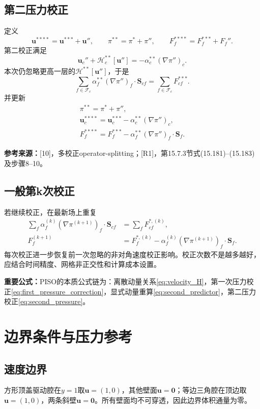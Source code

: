\documentclass[UTF8,12pt,a4paper]{ctexart}
\numberwithin{equation}{section}
\newcommand{\Issa}{\textnormal{[10]}}
\newcommand{\Rone}{\textnormal{[R1]}}
\newcommand{\source}[1]{\par\smallskip\noindent\colorbox{sourcebg}{%
  \parbox{0.955\linewidth}{\footnotesize\color{sourcegray}\textbf{参考来源：}#1}}\par\smallskip}
\newcommand{\keytitle}[1]{\par\smallskip\noindent\colorbox{keybg}{%
  \parbox{0.965\linewidth}{\color{keyblue}\textbf{重要公式：}#1}}\par\smallskip}
\begin{document}
\subsection{第二压力校正}
定义
\begin{equation}
  \bm u^{****}=\bm u^{***}+\bm u'',\qquad
  \pi^{**}=\pi^*+\pi'',\qquad
  F_f^{****}=F_f^{***}+F_f''.
\end{equation}
第二校正满足
\begin{equation}
  \bm u_c''+\mathcal H_c^{**}[\bm u'']
  =-\alpha_c^{**}(\nabla\pi'')_c.
  \label{eq:second_exact}
\end{equation}
本次仍忽略更高一层的$\mathcal H^{**}[\bm u'']$，于是
\begin{equation}
  \boxed{\sum_{f\in\mathcal F_c}
  \alpha_f^{**}(\nabla\pi'')_f\cdot\bm S_{cf}
  =\sum_{f\in\mathcal F_c}F_{cf}^{***}.}
  \label{eq:second_pressure}
\end{equation}
并更新
\begin{align}
  \boxed{\pi^{**}=\pi^*+\pi'',}\\
  \boxed{\bm u_c^{****}
  =\bm u_c^{***}-\alpha_c^{**}(\nabla\pi'')_c,}\\
  \boxed{F_f^{****}
  =F_f^{***}-\alpha_f^{**}(\nabla\pi'')_f\cdot\bm S_f.}
  \label{eq:second_updates}
\end{align}
\source{\Issa，多校正operator-splitting；\Rone，第15.7.3节式(15.181)--(15.183)及步骤8--10。}

\subsection{一般第k次校正}
若继续校正，在最新场上重复
\begin{align}
  \sum_f\alpha_f^{(k)}(\nabla\pi^{(k+1)})_f\cdot\bm S_{cf}
  &=\sum_fF_{cf}^{*,(k)},\\
  F_f^{(k+1)}
  &=F_f^{*,(k)}
  -\alpha_f^{(k)}(\nabla\pi^{(k+1)})_f\cdot\bm S_f.
\end{align}
每次校正进一步恢复前一次忽略的非对角速度校正影响。校正次数不是越多越好，应结合时间精度、网格非正交性和计算成本设置。

\keytitle{PISO的本质公式链为：离散动量关系\eqref{eq:velocity_H}，第一次压力校正\eqref{eq:first_pressure_correction}，显式动量重算\eqref{eq:second_predictor}，第二压力校正\eqref{eq:second_pressure}。}

\section{边界条件与压力参考}
\subsection{速度边界}
方形顶盖驱动腔在$y=1$取$\bm u=(1,0)$，其他壁面$\bm u=\bm0$；等边三角腔在顶边取$\bm u=(1,0)$，两条斜壁$\bm u=\bm0$。所有壁面均不可穿透，因此边界体积通量为零。
\end{document}
